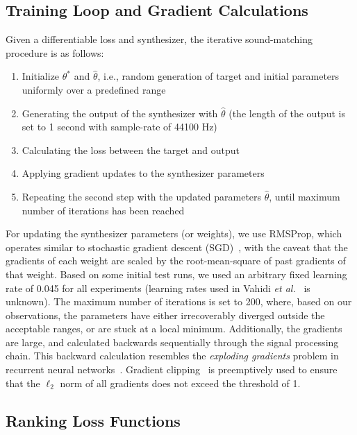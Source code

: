 \subsection{Training Loop and Gradient Calculations}
Given a differentiable loss and synthesizer, the iterative sound-matching procedure is as follows:
 \begin{enumerate}
    \item Initialize $\theta^*$ and $\hat{\theta}$, i.e., random generation of target and initial parameters uniformly over a predefined range
    \item Generating the output of the synthesizer with $\hat{\theta}$ (the length of the output is set to 1 second with sample-rate of 44100 Hz) 
    \item Calculating the loss between the target and output
    \item Applying gradient updates to the synthesizer parameters
    \item Repeating the second step with the updated parameters $\hat{\theta}$, until maximum number of iterations has been reached
 \end{enumerate}

 For updating the synthesizer parameters (or weights), we use RMSProp, which operates similar to stochastic gradient descent (SGD)~\cite{goodfellow2016deep}, with the caveat that the gradients of each weight are scaled by the root-mean-square of past gradients of that weight. Based on some initial test runs, we used an arbitrary fixed learning rate of 0.045 for all experiments (learning rates used in Vahidi \textit{et al.}~\cite{vahidi2023mesostructures} is unknown). The maximum number of iterations is set to 200, where, based on our observations, the parameters have either irrecoverably diverged outside the acceptable ranges, or are stuck at a local minimum. Additionally, the gradients are large, and calculated backwards sequentially through the signal processing chain. This backward calculation resembles the \textit{exploding gradients} problem in recurrent neural networks~\cite{gers2000learning}. Gradient clipping~\cite{goodfellow2016deep} is preemptively used to ensure that the  $\ell_2$ norm of all gradients does not exceed the threshold of 1. 
%
\subsection{Ranking Loss Functions}

